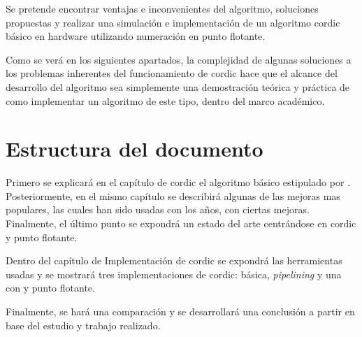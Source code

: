 Se pretende encontrar ventajas e inconvenientes del algoritmo, soluciones propuestas y realizar una simulación e implementación de un algoritmo \gls{cordic} básico en hardware utilizando numeración en punto flotante.

Como se verá en los siguientes apartados, la complejidad de algunas soluciones a los problemas inherentes del funcionamiento de \gls{cordic} hace que el alcance del desarrollo del algoritmo sea simplemente una demostración teórica y práctica de como implementar un algoritmo de este tipo, dentro del marco académico.


\section{Estructura del documento}

Primero se explicará en el capítulo de \gls{cordic} el algoritmo básico estipulado por \cite{volder_cordic_1959}. Posteriormente, en el mismo capítulo se describirá algunas de las mejoras mas populares, las cuales han sido usadas con los años, con ciertas mejoras. Finalmente, el último punto se expondrá un estado del arte centrándose en \gls{cordic} y punto flotante.

Dentro del capítulo de Implementación de \gls{cordic} se expondrá las herramientas usadas y se mostrará tres implementaciones de \gls{cordic}: básica, \textit{pipelining} y una con  y punto flotante.

Finalmente, se hará una comparación y se desarrollará una conclusión a partir en base del estudio y trabajo realizado.




















